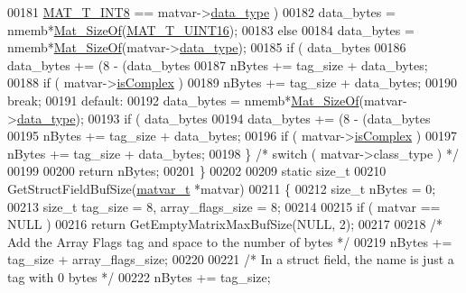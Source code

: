 \begin{DoxyCode}
00181                  \hyperlink{group___m_a_t_ggacf7b3b879282b7ab3a51190e49bf3453a9807f5033ed4f9b548953742d9fd1658}{MAT\_T\_INT8} == matvar->\hyperlink{group___m_a_t_ab6aafe9bd77f0f077852593dec438144}{data\_type} )
00182                 data\_bytes = nmemb*\hyperlink{group__mat__util_gab6774aabdc124c540c1e7686d0804940}{Mat\_SizeOf}(\hyperlink{group___m_a_t_ggacf7b3b879282b7ab3a51190e49bf3453a05bc7af7680aa68be95126ae0a4c2e31}{MAT\_T\_UINT16});
00183             \textcolor{keywordflow}{else}
00184                 data\_bytes = nmemb*\hyperlink{group__mat__util_gab6774aabdc124c540c1e7686d0804940}{Mat\_SizeOf}(matvar->\hyperlink{group___m_a_t_ab6aafe9bd77f0f077852593dec438144}{data\_type});
00185             \textcolor{keywordflow}{if} ( data\_bytes %
00186                 data\_bytes += (8 - (data\_bytes %
00187             nBytes += tag\_size + data\_bytes;
00188             \textcolor{keywordflow}{if} ( matvar->\hyperlink{group___m_a_t_aeb03b3a69f108dc05470b00443a43739}{isComplex} )
00189                 nBytes += tag\_size + data\_bytes;
00190             \textcolor{keywordflow}{break};
00191         \textcolor{keywordflow}{default}:
00192             data\_bytes = nmemb*\hyperlink{group__mat__util_gab6774aabdc124c540c1e7686d0804940}{Mat\_SizeOf}(matvar->\hyperlink{group___m_a_t_ab6aafe9bd77f0f077852593dec438144}{data\_type});
00193             \textcolor{keywordflow}{if} ( data\_bytes %
00194                 data\_bytes += (8 - (data\_bytes %
00195             nBytes += tag\_size + data\_bytes;
00196             \textcolor{keywordflow}{if} ( matvar->\hyperlink{group___m_a_t_aeb03b3a69f108dc05470b00443a43739}{isComplex} )
00197                 nBytes += tag\_size + data\_bytes;
00198     \} \textcolor{comment}{/* switch ( matvar->class\_type ) */}
00199 
00200     \textcolor{keywordflow}{return} nBytes;
00201 \}
00202 
00209 \textcolor{keyword}{static} \textcolor{keywordtype}{size\_t}
00210 GetStructFieldBufSize(\hyperlink{group___m_a_t_structmatvar__t}{matvar\_t} *matvar)
00211 \{
00212     \textcolor{keywordtype}{size\_t} nBytes = 0;
00213     \textcolor{keywordtype}{size\_t} tag\_size = 8, array\_flags\_size = 8;
00214 
00215     \textcolor{keywordflow}{if} ( matvar == NULL )
00216         \textcolor{keywordflow}{return} GetEmptyMatrixMaxBufSize(NULL, 2);
00217 
00218     \textcolor{comment}{/* Add the Array Flags tag and space to the number of bytes */}
00219     nBytes += tag\_size + array\_flags\_size;
00220 
00221     \textcolor{comment}{/* In a struct field, the name is just a tag with 0 bytes */}
00222     nBytes += tag\_size;

\end{DoxyCode}
